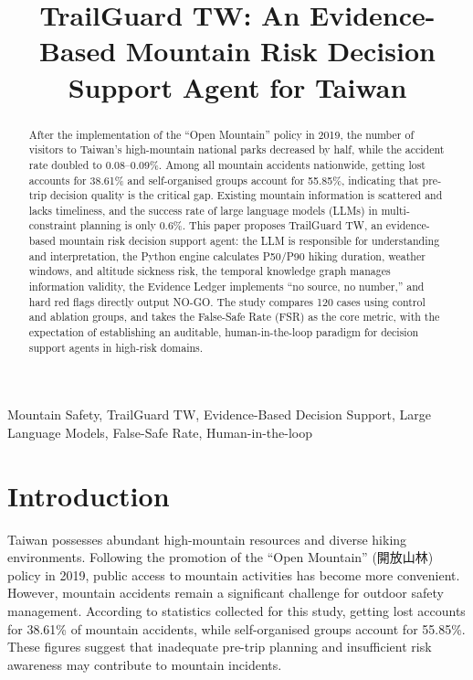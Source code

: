 \documentclass[conference]{IEEEtran}
\title{TrailGuard TW: An Evidence-Based Mountain Risk Decision Support Agent for Taiwan}
\author{
\IEEEauthorblockN{WEN WEI CHENG\IEEEauthorrefmark{1}}
\IEEEauthorblockA{\IEEEauthorrefmark{1}Department of Computer Science, National Chung Hsing University\\
Taiwan\\
wilber830915@gmail.com}
}
\begin{document}
\maketitle

\begin{abstract}
After the implementation of the ``Open Mountain'' policy in 2019, the number of visitors to Taiwan's high-mountain national parks decreased by half, while the accident rate doubled to 0.08--0.09\%. Among all mountain accidents nationwide, getting lost accounts for 38.61\% and self-organised groups account for 55.85\%, indicating that pre-trip decision quality is the critical gap. Existing mountain information is scattered and lacks timeliness, and the success rate of large language models (LLMs) in multi-constraint planning is only 0.6\%. This paper proposes TrailGuard TW, an evidence-based mountain risk decision support agent: the LLM is responsible for understanding and interpretation, the Python engine calculates P50/P90 hiking duration, weather windows, and altitude sickness risk, the temporal knowledge graph manages information validity, the Evidence Ledger implements ``no source, no number,'' and hard red flags directly output NO-GO. The study compares 120 cases using control and ablation groups, and takes the False-Safe Rate (FSR) as the core metric, with the expectation of establishing an auditable, human-in-the-loop paradigm for decision support agents in high-risk domains.
\end{abstract}

\begin{IEEEkeywords}
Mountain Safety, TrailGuard TW, Evidence-Based Decision Support, Large Language Models, False-Safe Rate, Human-in-the-loop
\end{IEEEkeywords}

\section{Introduction}
Taiwan possesses abundant high-mountain resources and diverse hiking environments. Following the promotion of the ``Open Mountain'' (開放山林) policy in 2019, public access to mountain activities has become more convenient. However, mountain accidents remain a significant challenge for outdoor safety management. According to statistics collected for this study, getting lost accounts for 38.61\% of mountain accidents, while self-organised groups account for 55.85\%. These figures suggest that inadequate pre-trip planning and insufficient risk awareness may contribute to mountain incidents.
\end{document}
